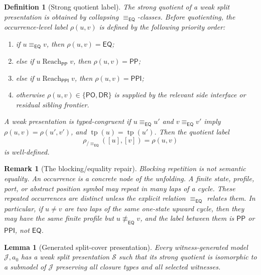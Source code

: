 \documentclass[11pt]{article}
\newtheorem{lemma}[theorem]{Lemma}
\newtheorem{definition}[theorem]{Definition}
\newtheorem{remark}[theorem]{Remark}
\newcommand{\EQ}{\mathsf{EQ}}
\newcommand{\PP}{\mathsf{PP}}
\newcommand{\PPI}{\mathsf{PPI}}
\newcommand{\PO}{\mathsf{PO}}
\newcommand{\DR}{\mathsf{DR}}
\newcommand{\J}{\mathcal J}
\newcommand{\typ}{\operatorname{tp}}
\newcommand{\eqc}{\equiv_{\EQ}}
\newcommand{\reach}{\operatorname{Reach}}
\begin{document}
\begin{definition}[Strong quotient label]
The strong quotient of a weak split presentation is obtained by collapsing \(\eqc\)-classes.  Before quotienting, the occurrence-level label \(\rho(u,v)\) is defined by the following priority order:
\begin{enumerate}[label=(L\arabic*)]
\item if \(u\eqc v\), then \(\rho(u,v)=\EQ\);
\item else if \(u\reach_\PP v\), then \(\rho(u,v)=\PP\);
\item else if \(u\reach_\PPI v\), then \(\rho(u,v)=\PPI\);
\item otherwise \(\rho(u,v)\in\{\PO,\DR\}\) is supplied by the relevant side interface or residual sibling frontier.
\end{enumerate}
A weak presentation is \emph{typed-congruent} if \(u\eqc u'\) and \(v\eqc v'\) imply \(\rho(u,v)=\rho(u',v')\), and \(\typ(u)=\typ(u')\).  Then the quotient label
\[
  \rho_{/\eqc}([u],[v])=\rho(u,v)
\]
is well-defined.
\end{definition}

\begin{remark}[The blocking/equality repair]
Blocking repetition is not semantic equality.  An occurrence is a concrete node of the unfolding.  A finite state, profile, port, or abstract position symbol may repeat in many laps of a cycle.  These repeated occurrences are distinct unless the explicit relation \(\eqc\) relates them.  In particular, if \(u\ne v\) are two laps of the same one-state upward cycle, then they may have the same finite profile but \(u\not\eqc v\), and the label between them is \(\PP\) or \(\PPI\), not \(\EQ\).
\end{remark}

\begin{lemma}[Generated split-cover presentation]\label{lem:split-cover}
Every witness-generated model \(\J,a_0\) has a weak split presentation \(\mathcal S\) such that its strong quotient is isomorphic to a submodel of \(\J\) preserving all closure types and all selected witnesses.
\end{lemma}
\end{document}
